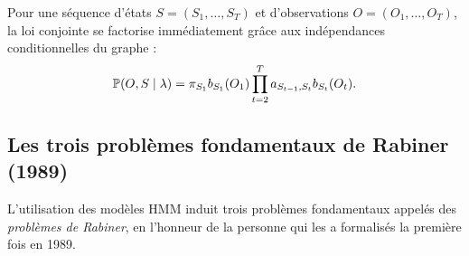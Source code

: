 Pour une séquence d'états $S = (S_1, \dots, S_T)$ et d'observations $O = (O_1, \dots, O_T)$, la loi conjointe se factorise immédiatement grâce aux indépendances conditionnelles du graphe :
\begin{equation}
    \mathbb{P}(O, S \mid \lambda) = \pi_{S_1} b_{S_1}(O_1) \prod_{t=2}^T a_{S_{t-1}, S_t} b_{S_t}(O_t).
\end{equation}

\subsection{Les trois problèmes fondamentaux de Rabiner (1989)}

L'utilisation des modèles HMM induit trois problèmes fondamentaux appelés des \emph{problèmes de Rabiner}, en l'honneur de la personne qui les a formalisés la première fois en 1989. 


